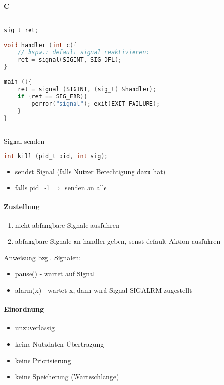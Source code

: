 \paragraph{C} $ $
\begin{lstlisting}[language=C]
sig_t ret;

void handler (int c){
	// bspw.: default signal reaktivieren:
	ret = signal(SIGINT, SIG_DFL);
}

main (){
	ret = signal (SIGINT, (sig_t) &handler);
	if (ret == SIG_ERR){
		perror("signal"); exit(EXIT_FAILURE);
	}
}
\end{lstlisting}

\subsection[kill]{}
Signal senden
\begin{lstlisting}[language=C]
int kill (pid_t pid, int sig);
\end{lstlisting}
\begin{itemize}
\item sendet Signal (falls Nutzer Berechtigung dazu hat)
\item falls pid=-1 $\Rightarrow$ senden an alle
\end{itemize}
\paragraph{Zustellung}
\begin{enumerate}
\item nicht abfangbare Signale ausführen
\item abfangbare Signale an handler geben, sonst default-Aktion ausführen
\end{enumerate}
Anweisung bzgl. Signalen:
\begin{itemize}
\item pause() - wartet auf Signal
\item alarm(x) - wartet x, dann wird Signal SIGALRM zugestellt
\end{itemize}
\paragraph{Einordnung}
\begin{itemize}
\item unzuverlässig
\item keine Nutzdaten-Übertragung
\item keine Priorisierung
\item keine Speicherung (Warteschlange)
\end{itemize}

